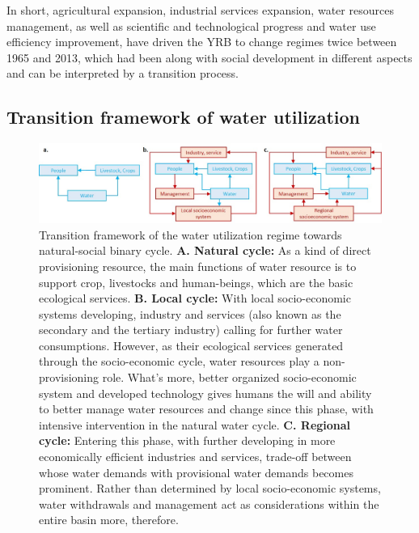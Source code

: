 \documentclass[9pt, twocolumn, twoside, lineno]{pnas-new}
\begin{document}
In short, agricultural expansion, industrial services expansion, water resources management, as well as scientific and technological progress and water use efficiency improvement, have driven the YRB to change regimes twice between 1965 and 2013, which had been along with social development in different aspects and can be interpreted by a transition process.

\subsection*{Transition framework of water utilization}

\begin{figure}[thbp]
	\centering
	\includegraphics[width=\linewidth]{../../figures/main/transition.jpg}
	\caption{
		Transition framework of the water utilization regime towards natural-social binary cycle.
		\textbf{A. Natural cycle:} As a kind of direct provisioning resource, the main functions of water resource is to support crop, livestocks and human-beings, which are the basic ecological services.
		\textbf{B. Local cycle:} With local socio-economic systems developing, industry and services (also known as the secondary and the tertiary industry) calling for further water consumptions.
		However, as their ecological services generated through the socio-economic cycle, water resources play a non-provisioning role. What's more, better organized socio-economic system and developed technology gives humans the will and ability to better manage water resources and change since this phase, with intensive intervention in the natural water cycle. 
		\textbf{C. Regional cycle:} Entering this phase, with further developing in more economically efficient industries and services, trade-off between whose water demands with provisional water demands becomes prominent. Rather than determined by local socio-economic systems, water withdrawals and management act as considerations within the entire basin more, therefore. 
	}
	\label{fig:summary}
\end{figure}
\end{document}
